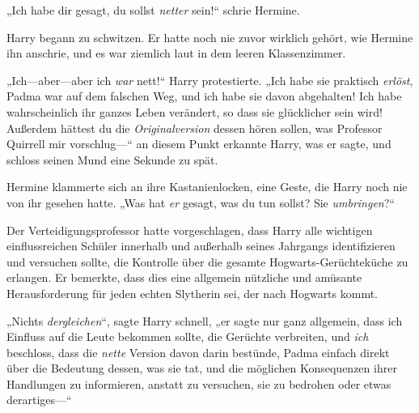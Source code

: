 

„Ich habe dir gesagt, du sollst \emph{netter} sein!“ schrie Hermine.

Harry begann zu schwitzen. Er hatte noch nie zuvor wirklich gehört, wie Hermine ihn anschrie, und es war ziemlich laut in dem leeren Klassenzimmer.

„Ich—aber—aber ich \emph{war} nett!“ Harry protestierte. „Ich habe sie praktisch \emph{erlöst}, Padma war auf dem falschen Weg, und ich habe sie davon abgehalten! Ich habe wahrscheinlich ihr ganzes Leben verändert, so dass sie glücklicher sein wird! Außerdem hättest du die \emph{Originalversion} dessen hören sollen, was Professor Quirrell mir vorschlug—“ an diesem Punkt erkannte Harry, was er sagte, und schloss seinen Mund eine Sekunde zu spät.

Hermine klammerte sich an ihre Kastanienlocken, eine Geste, die Harry noch nie von ihr gesehen hatte. „Was hat \emph{er} gesagt, was du tun sollst? Sie \emph{umbringen}?“

Der Verteidigungsprofessor hatte vorgeschlagen, dass Harry alle wichtigen einflussreichen Schüler innerhalb und außerhalb seines Jahrgangs identifizieren und versuchen sollte, die Kontrolle über die gesamte Hogwarts-Gerüchteküche zu erlangen. Er bemerkte, dass dies eine allgemein nützliche und amüsante Herausforderung für jeden echten Slytherin sei, der nach Hogwarts kommt.

„Nichts \emph{dergleichen}“, sagte Harry schnell, „er sagte nur ganz allgemein, dass ich Einfluss auf die Leute bekommen sollte, die Gerüchte verbreiten, und \emph{ich} beschloss, dass die \emph{nette} Version davon darin bestünde, Padma einfach direkt über die Bedeutung dessen, was sie tat, und die möglichen Konsequenzen ihrer Handlungen zu informieren, anstatt zu versuchen, sie zu bedrohen oder etwas derartiges—“

